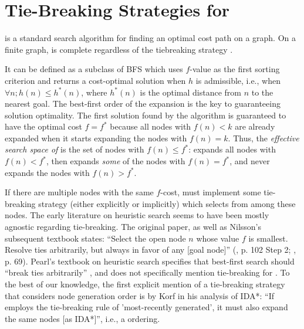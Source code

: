 \section{Tie-Breaking Strategies for \astar}

\label{sec:astar-background}

\astar is a standard search algorithm for finding an optimal cost path
on a graph.
On a finite graph, \astar is
complete regardless of the tiebreaking strategy \cite{hart1968formal}.

It can be defined as a subclass of BFS which uses $f$-value as the first sorting criterion
and returns a cost-optimal solution when $h$ is admissible, i.e., when
$\forall n; h(n) \leq h^*(n)$, where $h^*(n)$ is the optimal distance from $n$ to
the nearest goal.
% 
The best-first order of the expansion is the key to guaranteeing solution optimality. 
The first solution found by the algorithm is guaranteed to have the optimal cost $f=f^*$ because 
all nodes with $f(n) < k$ are already expanded when it starts expanding
the nodes with $f(n) = k$.
Thus, the \emph{effective search space of \astar} is the set of nodes with 
$f(n) \leq f^*$: \astar expands all nodes with $f(n) < f^*$, then
expands \emph{some} of the nodes with $f(n) = f^*$, and
never expands the nodes with $f(n) > f^*$.

If there are multiple nodes with the same $f$-cost, \astar
must implement some tie-breaking strategy (either
explicitly or implicitly) which selects from among these nodes.
The early literature on heuristic search seems to have been mostly agnostic regarding tie-breaking.
The original \astar paper, as well as Nilsson's subsequent textbook 
states: ``Select the open node $n$ whose value $f$
is smallest. Resolve ties arbitrarily, but always in favor of any [goal
node]'' 
(, p. 102 Step 2; , p. 69).
Pearl's textbook on heuristic search specifies that best-first search should ``break ties arbitrarily'' \cite[p. 48, Step 3]{pearl1984heuristics}, and does not specifically mention tie-breaking for \astar.
To the best of our knowledge, the first explicit mention of a tie-breaking strategy that considers node generation order is by Korf in his analysis of IDA*: ``If \astar employs the tie-breaking rule of 'most-recently generated', it must also expand the same nodes [as IDA*]'', i.e., a \lifo ordering.

